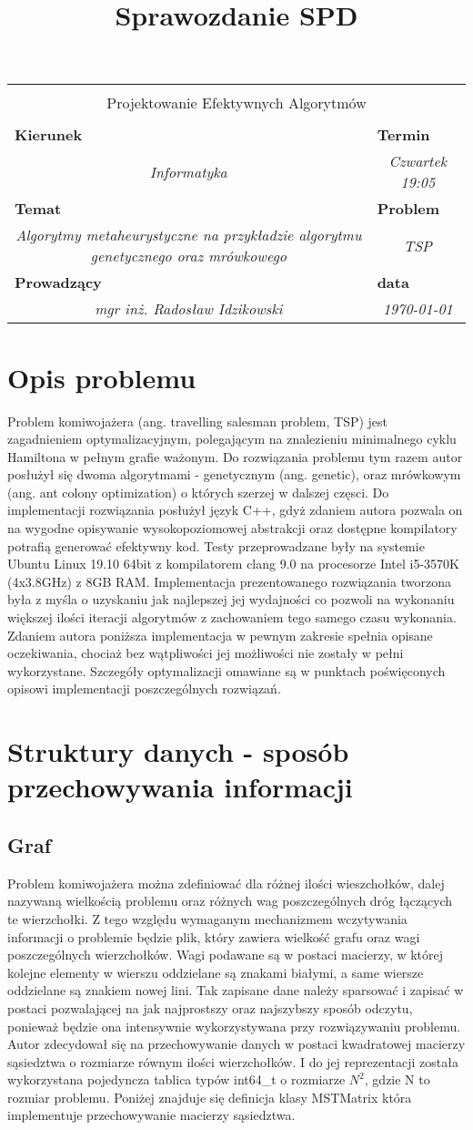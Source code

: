 \documentclass[polish,polish,a4paper]{article}
\title{Sprawozdanie SPD}
\newcommand{\name}[1]{\sffamily\bfseries\scriptsize #1}
\newcommand{\frontpage}[8]{

\vspace{2cm}

\begin{tabular}{|p{0.72\textwidth}|p{0.28\textwidth}|}
\hline
\multicolumn{2}{|c|}{}\\
\multicolumn{2}{|c|}{{\LARGE #1}}\\
\multicolumn{2}{|c|}{}\\
\hline
\name{Kierunek} & \name{Termin}\\
\multicolumn{1}{|c|}{\textit{#2}} & \multicolumn{1}{|c|}{\textit{#3}} \\
\hline
\name{Temat} & \name{Problem}\\
\multicolumn{1}{|c|}{\textit{#4}} & \multicolumn{1}{|c|}{\textit{#5}} \\
\hline
\name{Prowadzący} & \name{data}\\
\multicolumn{1}{|c|}{\textit{mgr inż. Radosław Idzikowski}} & \multicolumn{1}{|c|}{\textit{#6}} \\
\hline
\end{tabular}

}
\begin{document}
\frontpage{Projektowanie Efektywnych Algorytmów}{Informatyka}{Czwartek 19:05}{Algorytmy metaheurystyczne na przykładzie algorytmu genetycznego oraz mrówkowego}{TSP}{\today}
\pagestyle{empty}
\newpage

\section{Opis problemu}

Problem komiwojażera (ang. travelling salesman problem, TSP) jest zagadnieniem optymalizacyjnym, polegającym na znalezieniu minimalnego cyklu Hamiltona w pełnym grafie ważonym. Do rozwiązania problemu tym razem autor posłużył się dwoma algorytmami - genetycznym (ang. genetic), oraz mrówkowym
(ang. ant colony optimization) o których szerzej w dalszej częsci.
Do implementacji rozwiązania posłużył język C++, gdyż zdaniem autora pozwala on na wygodne opisywanie wysokopoziomowej abstrakcji oraz dostępne kompilatory
potrafią generować efektywny kod. Testy przeprowadzane były na systemie Ubuntu Linux 19.10 64bit z kompilatorem clang 9.0 na procesorze Intel i5-3570K (4x3.8GHz) z 8GB RAM. Implementacja prezentowanego rozwiązania tworzona była z myśla o uzyskaniu jak najlepszej jej wydajności co pozwoli na wykonaniu
większej ilości iteracji algorytmów z zachowaniem tego samego czasu wykonania.
Zdaniem autora poniższa implementacja w pewnym zakresie spełnia opisane oczekiwania, chociaż bez wątpliwości jej możliwości nie zostały w pełni
wykorzystane. Szczegóły optymalizacji omawiane są w punktach poświęconych opisowi implementacji poszczególnych rozwiązań.

\section{Struktury danych - sposób przechowywania informacji}

\subsection{Graf}

Problem komiwojażera można zdefiniować dla różnej ilości wieszchołków, dalej nazywaną wielkością problemu oraz różnych wag poszczególnych dróg łączących te wierzchołki.
Z tego względu wymaganym mechanizmem wczytywania informacji o problemie będzie plik, który zawiera wielkość grafu oraz wagi poszczególnych wierzchołków.
Wagi podawane są w postaci macierzy, w której kolejne elementy w wierszu oddzielane są znakami białymi, a same wiersze oddzielane są znakiem nowej lini.
Tak zapisane dane należy sparsować i zapisać w postaci pozwalającej na jak najprostszy oraz najszybszy sposób odczytu, ponieważ będzie ona intensywnie wykorzystywana przy rozwiązywaniu problemu.
Autor zdecydował się na przechowywanie danych w postaci kwadratowej macierzy sąsiedztwa o rozmiarze równym ilości wierzchołków.
I do jej reprezentacji została wykorzystana pojedyncza tablica typów int64\_t o rozmiarze $N^{2}$, gdzie N to rozmiar problemu.
Poniżej znajduje się definicja klasy MSTMatrix która implementuje przechowywanie macierzy sąsiedztwa.
\end{document}
